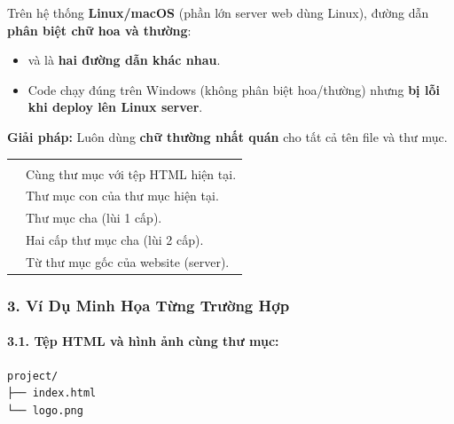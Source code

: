 \begin{warnBox}
Trên hệ thống \textbf{Linux/macOS} (phần lớn server web dùng Linux), đường dẫn \textbf{phân biệt chữ hoa và thường}:
\begin{itemize}[leftmargin=1.5em, itemsep=2pt, parsep=0pt]
    \item {} và  là \textbf{hai đường dẫn khác nhau}.
    \item Code chạy đúng trên Windows (không phân biệt hoa/thường) nhưng \textbf{bị lỗi khi deploy lên Linux server}.
\end{itemize}
\textbf{Giải pháp:} Luôn dùng \textbf{chữ thường nhất quán} cho tất cả tên file và thư mục.
\end{warnBox}

\begin{prettyTableBox}
\begin{tabularx}{\linewidth}{L{4cm} Z}
 &  \\
 & Cùng thư mục với tệp HTML hiện tại. \\
 & Thư mục con  của thư mục hiện tại. \\
 & Thư mục cha (lùi 1 cấp). \\
 & Hai cấp thư mục cha (lùi 2 cấp). \\
 & Từ thư mục gốc của website (server). \\
\end{tabularx}
\end{prettyTableBox}

\subsubsection{3. Ví Dụ Minh Họa Từng Trường Hợp}

\paragraph{3.1. Tệp HTML và hình ảnh cùng thư mục:}

\begin{codeWindow}
\begin{lstlisting}[language=HTML5]
project/
├── index.html
└── logo.png
\end{lstlisting}
\end{codeWindow}

